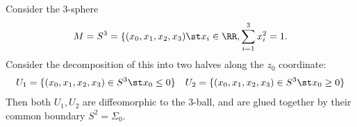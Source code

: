 

    Consider the 3-sphere
    \[M=S^3=\{(x_0, x_1, x_2, x_3)\st x_i\in \RR, \sum_{i=1}^3 x_i^2=1.\]
    Consider the decomposition of this into two halves along the $z_0$ coordinate:
    \begin{align*}
        U_1=\{(x_0, x_1, x_2, x_3)\in S^3 \st x_0\leq 0\}&& U_2=\{(x_0, x_1, x_2, x_3)\in S^3 \st x_0\geq 0\}
    \end{align*}
    Then both $U_1, U_2$ are diffeomorphic to the 3-ball, and are glued together by their common boundary $S^2=\Sigma_0$. 
    \label{exm:heegaardSplitting}
